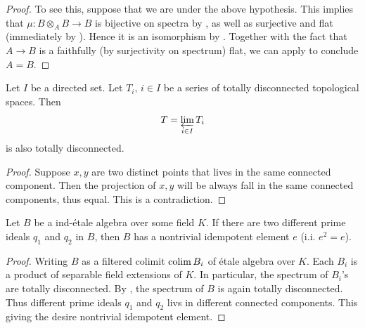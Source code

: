 \begin{proof}
    To see this, suppose that we are under the above hypothesis.
    This implies that $\mu : B \otimes_A B \to B$ is bijective on spectra by
    ,
    as well as surjective and flat (immediately by ).
    Hence it is an isomorphism by . Together with
    the fact that $A \to B$ is a faithfully (by surjectivity on spectrum) flat, we can apply
     to conclude $A = B$.
\end{proof}

\begin{lemma}
    \label{lem:totally-disconnected-inverse-limit}
    Let $I$ be a directed set. Let $T_i, \, i \in I$ be a series of totally disconnected
    topological spaces. Then
    $$T = \varprojlim_{i \in I} T_i $$ is also totally disconnected.
    \leanok
\end{lemma}

\begin{proof}
    \leanok
    Suppose $x, y$ are two distinct points that lives in the same connected component. Then the
    projection of $x, y$ will be always fall in the same connected components, thus equal. This
    is a contradiction.
\end{proof}

\begin{lemma}
    \label{lem:idempotent-in-ind-etale-of-primes}
    Let $B$ be a ind-\'etale algebra over some field $K$. If there are
    two different prime ideals $q_1$ and $q_2$ in $B$, then $B$ has a nontrivial
    idempotent element $e$ (i.i. $e^2 = e$).
    \leanok
\end{lemma}

\begin{proof}
    Writing $B$ as a filtered colimit $\operatorname{colim} B_i$ of \'etale algebra over $K$. Each $B_i$ is a
    product of separable field extensions of $K$. In particular, the spectrum of $B_i$'s are totally
    disconnected. By , the spectrum of $B$ is again
    totally disconnected. Thus different prime ideals $q_1$ and $q_2$ livs in
    different connected components. This giving the desire nontrivial idempotent element.
\end{proof}

